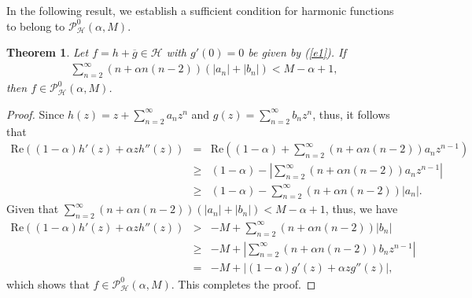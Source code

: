\documentclass[11pt,reqno]{amsart}
\newtheorem{theo}{Theorem}[section]
\newtheorem{open problem}{Open problem}[section]
\newcommand{\ol}{\overline}
\newcommand{\beas}{\begin{eqnarray*}}
\newcommand{\eeas}{\end{eqnarray*}}
\numberwithin{equation}{section}
\begin{document}
\noindent In the following result, we establish a sufficient condition for harmonic functions to belong to $\mathcal{P}_{\mathcal{H}}^0(\alpha,M)$.
\begin{theo}\label{TT1} Let $f=h+\ol{g}\in\mathcal{H}$ with $g'(0)=0$ be given by (\ref{e1}). If 
\beas \sum_{n=2}^\infty (n+\alpha n(n-2))\left(|a_n|+|b_n|\right)< M-\alpha+1,\eeas
then $f\in\mathcal{P}_{\mathcal{H}}^0(\alpha,M)$.\end{theo}
\begin{proof}Since $h(z)=z+\sum_{n=2}^\infty a_nz^n$ and $g(z)=\sum_{n=2}^\infty b_nz^n$, thus, it follows that
\beas \textrm{Re}\left((1-\alpha)h'(z)+\alpha zh''(z)\right)&=&\text{Re}\left((1-\alpha)+\sum_{n=2}^\infty (n+\alpha n(n-2))a_nz^{n-1}\right)\\[1mm]
&\geq&(1-\alpha)-\left|\sum_{n=2}^\infty (n+\alpha n(n-2))a_nz^{n-1}\right|\\[1mm]
&\geq&(1-\alpha)-\sum_{n=2}^\infty (n+\alpha n(n-2))|a_n|.\eeas
Given that $\sum_{n=2}^\infty (n+\alpha n(n-2))\left(|a_n|+|b_n|\right)< M-\alpha+1$, thus, we have
\beas \text{Re}\left((1-\alpha)h'(z)+\alpha zh''(z)\right)&>&  -M+\sum_{n=2}^\infty  (n+\alpha n(n-2))|b_n|\\[1mm]
&\geq& -M+\left|\sum_{n=2}^\infty  (n+\alpha n(n-2))b_n z^{n-1}\right|\\[1mm]
&=&-M+\left|(1-\alpha)g'(z)+\alpha zg''(z)\right|,\eeas
which shows that $f\in\mathcal{P}_{\mathcal{H}}^0(\alpha,M)$. This completes the proof.
\end{proof}
\end{document}
